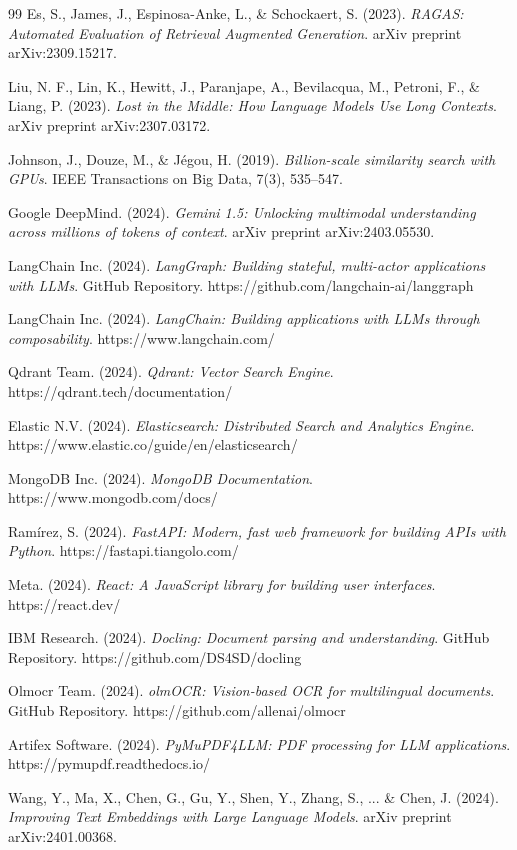 \documentclass[../DoAn.tex]{subfiles}
\begin{document}
\begin{thebibliography}{99}
Es, S., James, J., Espinosa-Anke, L., \& Schockaert, S. (2023). 
\textit{RAGAS: Automated Evaluation of Retrieval Augmented Generation}. 
arXiv preprint arXiv:2309.15217.

Liu, N. F., Lin, K., Hewitt, J., Paranjape, A., Bevilacqua, M., Petroni, F., \& Liang, P. (2023). 
\textit{Lost in the Middle: How Language Models Use Long Contexts}. 
arXiv preprint arXiv:2307.03172.

Johnson, J., Douze, M., \& Jégou, H. (2019). 
\textit{Billion-scale similarity search with GPUs}. 
IEEE Transactions on Big Data, 7(3), 535--547.

Google DeepMind. (2024). 
\textit{Gemini 1.5: Unlocking multimodal understanding across millions of tokens of context}. 
arXiv preprint arXiv:2403.05530.

LangChain Inc. (2024). 
\textit{LangGraph: Building stateful, multi-actor applications with LLMs}. 
GitHub Repository. https://github.com/langchain-ai/langgraph

LangChain Inc. (2024). 
\textit{LangChain: Building applications with LLMs through composability}. 
https://www.langchain.com/

Qdrant Team. (2024). 
\textit{Qdrant: Vector Search Engine}. 
https://qdrant.tech/documentation/

Elastic N.V. (2024). 
\textit{Elasticsearch: Distributed Search and Analytics Engine}. 
https://www.elastic.co/guide/en/elasticsearch/

MongoDB Inc. (2024). 
\textit{MongoDB Documentation}. 
https://www.mongodb.com/docs/

Ramírez, S. (2024). 
\textit{FastAPI: Modern, fast web framework for building APIs with Python}. 
https://fastapi.tiangolo.com/

Meta. (2024). 
\textit{React: A JavaScript library for building user interfaces}. 
https://react.dev/

IBM Research. (2024). 
\textit{Docling: Document parsing and understanding}. 
GitHub Repository. https://github.com/DS4SD/docling

Olmocr Team. (2024). 
\textit{olmOCR: Vision-based OCR for multilingual documents}. 
GitHub Repository. https://github.com/allenai/olmocr

Artifex Software. (2024). 
\textit{PyMuPDF4LLM: PDF processing for LLM applications}. 
https://pymupdf.readthedocs.io/

Wang, Y., Ma, X., Chen, G., Gu, Y., Shen, Y., Zhang, S., ... \& Chen, J. (2024). 
\textit{Improving Text Embeddings with Large Language Models}. 
arXiv preprint arXiv:2401.00368.

\end{thebibliography}
\end{document}
